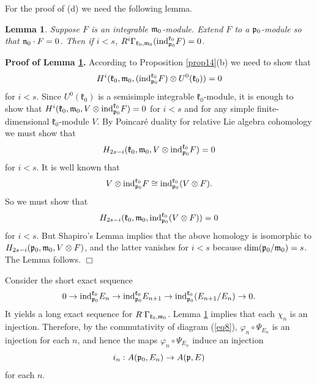 \documentclass[12pt]{article}
\newcounter{theorem}
\newtheorem{lemma}[theo]{Lemma}
\newcommand{\kk}{\mathfrak{k}}
\renewcommand {\phi} {\varphi}
\newcommand{\refle}[1]{Lemma \ref{#1}}
\newcommand{\refprop}[1]{Proposition \ref{#1}}
\newcommand{\refeq}[1]{(\ref{#1})}
\newcommand{\ind}{\mathrm{ind}}
\newcommand{\qed}{$\Box$}
\def\ind{\text{\rm ind}}
\begin{document}

For the proof of (d) we need the following lemma.

\begin{lemma}\label{le24}  Suppose $F$ is an integrable $\frak m_0$-module.  Extend $F$ to a $\frak p_0$-module so that $\frak n_0\cdot
F = 0$.  Then if $i < s$, $R^i \Gamma_{\frak k_{0},\frak m_{0}}(\ind^{\frak k_{0}}_{\frak p_{0}} F) = 0$.
\end{lemma}

\textbf{Proof of \refle{le24}.} According to \refprop{prop14}(b) we need to show that
$$
H^i(\frak k_0,\frak m_0, (\text{ind}^{\frak k_{0}}_{\frak p_{0}} F)\otimes U^0(\frak k_0)) = 0
$$
for $i < s$.  Since $U^0(\kk_0)$ is a semisimple integrable $\kk_0$-module, it is enough to show that  $H^i (\frak k_0, \frak m_0 , V\otimes \text{ind}^{\frak k_{0}}_{\frak p_{0}} F) = 0$ for $i < s$ and for any simple finite-dimensional $\kk_0$-module $V$.  By Poincar\'e duality for relative Lie algebra cohomology we must show that
$$
H_{2s-i} (\frak k_0,\frak m_0, V \otimes \text{ind}^{\frak k_{0}} _{\frak p_{0}} F) = 0
$$
for $i < s$. It is well known that
$$
V\otimes \text{ind}^{\frak k_{0}} _{\frak p_{0}} F \cong \text{ind}^{\frak k_{0}} _{\frak p_{0}}(V\otimes F).
$$
So we must show that
$$
H_{2s-i} (\frak k_0, \frak m_0, \text{ind}^{\frak k_{0}} _{\frak p_{0}}(V\otimes F)) = 0
$$
for $i < s$.  But Shapiro's Lemma implies that the above homology is isomorphic to $H_{2s-i} (\frak p_0, \frak m_0, V\otimes F)$, and the latter vanishes for  $i < s$ because $\dim (\frak p_0 / \frak m_0) = s$.  The Lemma follows.  \qed

\item[(d)] Consider the short exact sequence
$$
0\to\text{ind}^{\frak k_{0}} _{\frak p_{0}}  E_n \to\text{ind}^{\frak k_{0}} _{\frak p_{0}} E_{n+1} \to\text{ind}^{\frak k_{0}} _{\frak p_{0}} (E_{n+1}/E_n) \to 0.
$$
It yields a long exact sequence for $R^\cdot \Gamma_{\frak k_{0},\frak m_{0}}$.  \refle{le24} implies that each $\chi_n$ is an injection.  Therefore, by the commutativity of diagram \refeq{eq8}, $\phi_n\circ \Psi_{E_{n}}$ is an injection for each $n$, and hence the maps $\phi_n\circ\Psi_{E_{n}}$ induce an injection
$$
i_n : A(\frak p_0, E_n) \to A(\frak p, E)
$$
for each $n$.
\end{document}
